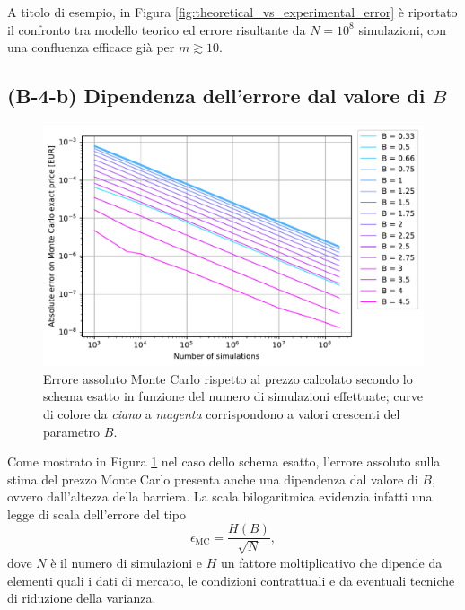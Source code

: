 A titolo di esempio, in Figura \ref{fig:theoretical_vs_experimental_error} è riportato il confronto tra modello teorico ed errore risultante da $N={10}^8$ simulazioni, con una confluenza efficace già per $m \gtrsim 10$.

\subsection{(B-4-b) Dipendenza dell'errore dal valore di \texorpdfstring{$B$}{B}}

\begin{figure}[t]
    \centering
    \includegraphics[scale=0.5]{graphs/OptionPriceVsB_ExactErrorVsN_WithAllBs.pdf}
    \caption[Errore assoluto Monte Carlo rispetto al prezzo calcolato secondo lo schema esatto in funzione del numero di simulazioni effettuate per diversi valori si $B$.]{Errore assoluto Monte Carlo rispetto al prezzo calcolato secondo lo schema esatto in funzione del numero di simulazioni effettuate; curve di colore da \textit{ciano} a \textit{magenta} corrispondono a valori crescenti del parametro $B$.}
    \label{fig:error_vs_B}
\end{figure}

Come mostrato in Figura \ref{fig:error_vs_B} nel caso dello schema esatto, l'errore assoluto sulla stima del prezzo Monte Carlo presenta anche una dipendenza dal valore di $B$, ovvero dall'altezza della barriera. La scala bilogaritmica evidenzia infatti una legge di scala dell'errore del tipo
\begin{equation}
    \epsilon_\text{MC} = \frac{H(B)}{\sqrt{N}},
    \label{eq:h_of_b}
\end{equation}
dove $N$ è il numero di simulazioni e $H$ un fattore moltiplicativo che dipende da elementi quali i dati di mercato, le condizioni contrattuali e da eventuali tecniche di riduzione della varianza.

